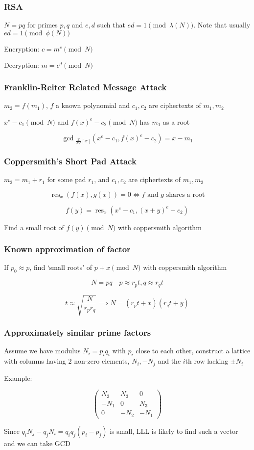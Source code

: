 \documentclass{beamer}
\begin{document}
\begin{frame}
    \frametitle{RSA}
    $N=pq$ for primes $p,q$ and $e,d$ such that $ed=1\pmod{\lambda(N)}$. Note that usually $ed=1\pmod{\phi(N)}$

    Encryption: $c=m^e\pmod N$
    
    Decryption: $m=c^d\pmod N$
\end{frame}

\begin{frame}
    \frametitle{Franklin-Reiter Related Message Attack}
    $m_2=f(m_1)$, $f$ a known polynomial and $c_1,c_2$ are ciphertexts of $m_1,m_2$

    $x^e-c_1\pmod N$ and $f(x)^e-c_2\pmod N$ has $m_1$ as a root\pause

    $$\gcd\!_{\frac{\mathbb Z}{N\mathbb Z}[x]}\left(x^e-c_1,f(x)^e-c_2\right)=x-m_1$$
\end{frame}

\begin{frame}
    \frametitle{Coppersmith's Short Pad Attack}
    $m_2=m_1+r_1$ for some pad $r_1$, and $c_1,c_2$ are ciphertexts of $m_1,m_2$\pause
    
    $$\operatorname{res}_x(f(x),g(x))=0\iff f\text{ and }g\text{ shares a root}$$\pause

    $$f(y)=\operatorname{res}_x\left(x^e-c_1,(x+y)^e-c_2\right)$$

    Find a small root of $f(y)\pmod N$ with coppersmith algorithm
\end{frame}

\begin{frame}
    \frametitle{Known approximation of factor}
    If $p_0\approx p$, find `small roots' of $p+x\pmod N$ with coppersmith algorithm\pause

    $$N=pq\quad p\approx r_pt,q\approx r_qt$$
    
    $$t\approx\sqrt{\frac N{r_pr_q}}\implies N=\left(r_pt+x\right)\left(r_qt+y\right)$$
\end{frame}

\begin{frame}
    \frametitle{Approximately similar prime factors}
    Assume we have modulus $N_i=p_iq_i$ with $p_i$ close to each other, construct a lattice with columns having $2$ non-zero elements, $N_i,-N_j$ and the $i$th row lacking $\pm N_i$

    Example:

    $$\begin{pmatrix}
        N_2 & N_3 & 0 \\
        -N_1 & 0 & N_3 \\
        0 & -N_2 & -N_1
    \end{pmatrix}$$

    Since $q_iN_j-q_jN_i=q_iq_j\left(p_i-p_j\right)$ is small, LLL is likely to find such a vector and we can take GCD
\end{frame}
\end{document}
